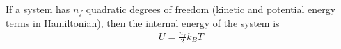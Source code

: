 

\vspace*{\fill}
\centering

If a system has $n_{f}$ quadratic degrees of freedom (kinetic and potential energy terms in Hamiltonian), then the internal energy of the system is
\begin{align*}
   U = \frac{n_{f}}{2}k_{B}T
\end{align*}

\centering
\vspace*{\fill}


